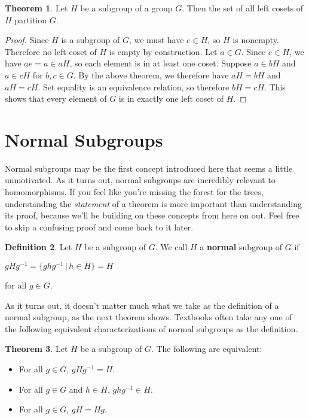 \documentclass[12pt]{article}
\newcommand{\inv}[1]{#1^{-1}}
\theoremstyle{definition}
\newtheorem{theorem}{Theorem}[section]
\theoremstyle{definition}
\newtheorem{definition}[theorem]{Definition}
\theoremstyle{definition}
\theoremstyle{definition}
\begin{document}
\begin{theorem}
Let $H$ be a subgroup of a group $G$. Then the set of all left cosets of $H$ partition $G$.
\end{theorem}

\begin{proof}
Since $H$ is a subgroup of $G$, we must have $e \in H$, so $H$ is nonempty. Therefore no left coset of $H$ is empty by construction. Let $a \in G$. Since $e \in H$, we have $ae = a \in aH$, so each element is in at least one coset. Suppose $a \in bH$ and $a \in cH$ for $b, c \in G$. By the above theorem, we therefore have $aH = bH$ and $aH = cH$. Set equality is an equivalence relation, so therefore $bH = cH$. This shows that every element of $G$ is in exactly one left coset of $H$.

\end{proof}


\section{Normal Subgroups}

Normal subgroups may be the first concept introduced here that seems a little unmotivated. As it turns out, normal subgroups are incredibly relevant to homomorphisms. If you feel like you're missing the forest for the trees, understanding the \textit{statement} of a theorem is more important than understanding its proof, because we'll be building on these concepts from here on out. Feel free to skip a confusing proof and come back to it later.

\begin{definition}
Let $H$ be a subgroup of $G$. We call $H$ a \textbf{normal} subgroup of $G$ if
\begin{center}
    $gH\inv{g} = \{gh\inv{g} \,|\, h \in H\} = H$
\end{center}
for all $g \in G$.
\end{definition}

As it turns out, it doesn't matter much what we take as the definition of a normal subgroup, as the next theorem shows. Textbooks often take any one of the following equivalent characterizations of normal subgroups as the definition.

\begin{theorem}
Let $H$ be a subgroup of $G$. The following are equivalent:
\begin{itemize}
\item For all $g \in G$, $gH\inv{g} = H$.
\item For all $g \in G$ and $h \in H$, $gh\inv{g} \in H$.
\item For all $g \in G$, $gH = Hg$.
\end{itemize}
\end{theorem}
\end{document}
